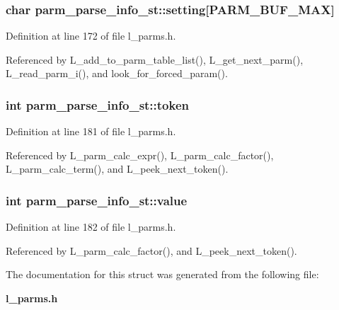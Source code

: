 \subsubsection{\setlength{\rightskip}{0pt plus 5cm}char \bf{parm\_\-parse\_\-info\_\-st::setting}[PARM\_\-BUF\_\-MAX]}\label{structparm__parse__info__st_255049943de34c7e2cd0d3e5d6a789cc}




Definition at line 172 of file l\_\-parms.h.

Referenced by L\_\-add\_\-to\_\-parm\_\-table\_\-list(), L\_\-get\_\-next\_\-parm(), L\_\-read\_\-parm\_\-i(), and look\_\-for\_\-forced\_\-param().
\subsubsection{\setlength{\rightskip}{0pt plus 5cm}int \bf{parm\_\-parse\_\-info\_\-st::token}}\label{structparm__parse__info__st_f0c50859a3492770c059b24e64c54a9e}




Definition at line 181 of file l\_\-parms.h.

Referenced by L\_\-parm\_\-calc\_\-expr(), L\_\-parm\_\-calc\_\-factor(), L\_\-parm\_\-calc\_\-term(), and L\_\-peek\_\-next\_\-token().
\subsubsection{\setlength{\rightskip}{0pt plus 5cm}int \bf{parm\_\-parse\_\-info\_\-st::value}}\label{structparm__parse__info__st_90e7fa86226c56f13c03f73faefd28f8}




Definition at line 182 of file l\_\-parms.h.

Referenced by L\_\-parm\_\-calc\_\-factor(), and L\_\-peek\_\-next\_\-token().

The documentation for this struct was generated from the following file:\begin{CompactItemize}
\item 
\bf{l\_\-parms.h}\end{CompactItemize}
